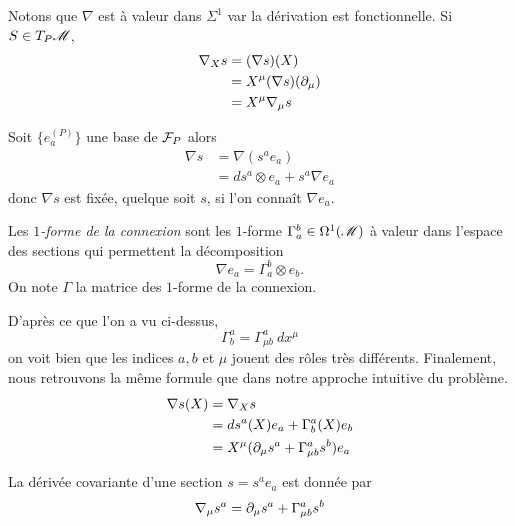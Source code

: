 \documentclass[a4paper,11pt]{report}
\begin{document}
                Notons que $\nabla$ est à valeur dans $\Sigma^1$ var la dérivation est fonctionnelle. Si $S\in T_P\mathscr{M}$,
                \begin{align}
                    \nabla_X s &= (\nabla s)(X)\\
                    &= X^\mu(\nabla s)(\partial_\mu)\\
                    &= X^\mu\nabla_\mu s
                \end{align}
             
                Soit $\{e_a^{(P)}\}$ une base de $\mathcal{F}_P$ alors
                \begin{align}
                    \nabla s &= \nabla(s^a e_a)\\
                    &= ds^a\otimes e_a+s^a\nabla e_a
                \end{align}
            donc $\nabla s$ est fixée, quelque soit $s$, si l'on connaît $\nabla e_a$. 
            \begin{definition}
                Les \textit{$1$-forme de la connexion} sont les  $1$-forme $\Gamma^b_a\in\Omega^1(\mathscr{M})$ à valeur dans l'espace des sections qui permettent la décomposition
                \begin{equation}
                    \nabla e_a = \Gamma^b_a \otimes e_b.
                \end{equation}
                On note $\Gamma$ la matrice des $1$-forme de la connexion.
             \end{definition}
             
            D'après ce que l'on a vu ci-dessus,
            \begin{equation}
                 \Gamma^a_b = \Gamma^a_{\mu b}~dx^\mu
            \end{equation}
            on voit bien que les indices $a,b$ et $\mu$ jouent des rôles très différents. Finalement, nous retrouvons la même formule que dans notre approche intuitive du problème.
            \begin{align}
                 \nabla s(X) &= \nabla_X s\\
                 &= ds^a(X)e_a+\Gamma^a_b(X)e_b\\
                 &= X^\mu(\partial_\mu s^a+\Gamma^a_{\mu b}s^b)e_a
            \end{align}
             
            \begin{prop}\begin{leftbar}
                    La dérivée covariante d'une section $s = s^a e_a$ est donnée par
                    \begin{equation}
                        \nabla_\mu s^a = \partial_\mu s^a+\Gamma^a_{\mu b}s^b
                    \end{equation}
            \end{leftbar}\end{prop}
             
\end{document}
